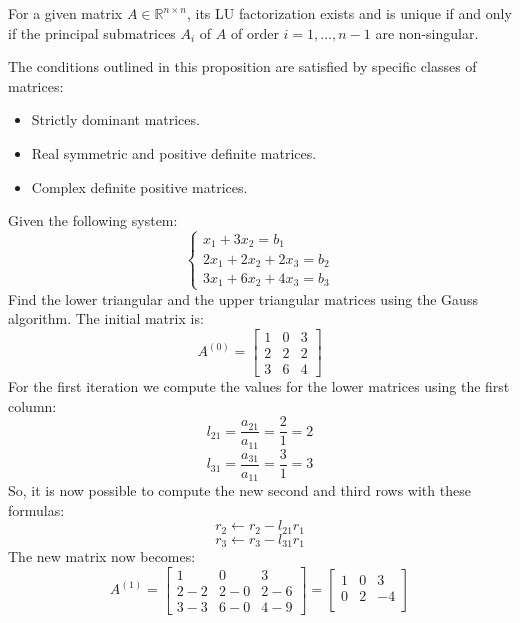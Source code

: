 \documentclass[12pt, a4paper]{report}
\begin{document}
    \begin{proposition}
        For a given matrix $A \in \mathbb{R}^{n \times n}$, its LU factorization exists and is unique if and only if the principal submatrices $A_i$ of $A$ of order $i=1,\dots,n-1$ are non-singular. 
    \end{proposition}
    The conditions outlined in this proposition are satisfied by specific classes of matrices:
    \begin{itemize}
        \item Strictly dominant matrices. 
        \item Real symmetric and positive definite matrices. 
        \item Complex definite positive matrices. 
    \end{itemize}
    \begin{example}
        Given the following system: 
        \[  \begin{cases}
                x_1+3x_2=b_1 \\
                2x_1+2x_2+2x_3=b_2 \\
                3x_1+6x_2+4x_3=b_3
            \end{cases}\]
        Find the lower triangular and the upper triangular matrices using the Gauss algorithm. The initial matrix is: 
        \[A^{(0)}=            
            \begin{bmatrix}
                1 & 0 & 3 \\
                2 & 2 & 2 \\
                3 & 6 & 4
            \end{bmatrix}\]
        For the first iteration we compute the values for the lower matrices using the first column: 
        \[l_{21}=\dfrac{a_{21}}{a_{11}}=\dfrac{2}{1}=2\]
        \[l_{31}=\dfrac{a_{31}}{a_{11}}=\dfrac{3}{1}=3\]
        So, it is now possible to compute the new second and third rows with these formulas: 
        \[r_2 \leftarrow r_2 - l_{21}r_1\]
        \[r_3 \leftarrow r_3 - l_{31}r_1\]
        The new matrix now becomes: 
        \[A^{(1)}=            
        \begin{bmatrix}
            1 & 0 & 3 \\
            2-2 & 2-0 & 2-6 \\
            3-3 & 6-0 & 4-9
        \end{bmatrix} =
        \begin{bmatrix}
            1 & 0 & 3 \\
            0 & 2 & -4 \\

\end{bmatrix}\]
\end{example}
\end{document}
